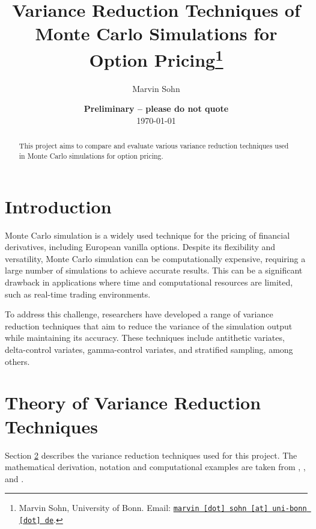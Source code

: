 \documentclass[11pt, a4paper, leqno]{article}
\begin{document}
\title{Variance Reduction Techniques of Monte Carlo Simulations for Option Pricing\thanks{Marvin Sohn, University of Bonn. Email: \href{mailto:marvin.sohn@uni-bonn.de}{\nolinkurl{marvin [dot] sohn [at] uni-bonn [dot] de}}.}}

\author{Marvin Sohn}

\date{
    {\bf Preliminary -- please do not quote}
    \\[1ex]
    \today
}

\maketitle


\begin{abstract}
    This project aims to compare and evaluate various variance reduction techniques used in Monte Carlo simulations for option pricing.
\end{abstract}

\clearpage


\section{Introduction} %
\label{sec:introduction}

Monte Carlo simulation is a widely used technique for the pricing of financial derivatives, including European vanilla options. Despite its flexibility and versatility, Monte Carlo simulation can be computationally expensive, requiring a large number of simulations to achieve accurate results. This can be a significant drawback in applications where time and computational resources are limited, such as real-time trading environments.

To address this challenge, researchers have developed a range of variance reduction techniques that aim to reduce the variance of the simulation output while maintaining its accuracy. These techniques include antithetic variates, delta-control variates, gamma-control variates, and stratified sampling, among others.

\section{Theory of Variance Reduction Techniques}\label{sec:var_reduc_techniques}

Section \ref{sec:var_reduc_techniques} describes the variance reduction techniques used for this project. The mathematical derivation, notation and computational examples are taken from \cite{Glassermann:2004}, \cite{Hilpisch:2015}, and \cite{Clewlow:1998}.
\end{document}
